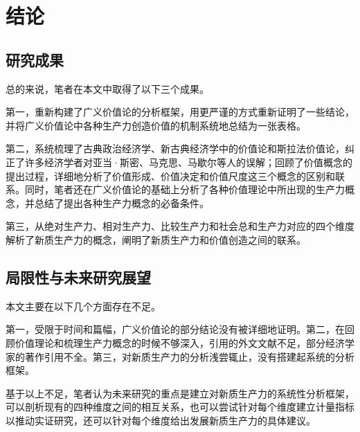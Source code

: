 
\chapter{结论}

\section{研究成果}

总的来说，笔者在本文中取得了以下三个成果。

第一，重新构建了广义价值论的分析框架，用更严谨的方式重新证明了一些结论，并将广义价值论中各种生产力创造价值的机制系统地总结为一张表格。

第二，系统梳理了古典政治经济学、新古典经济学中的价值论和斯拉法价值论，纠正了许多经济学者对亚当·斯密、马克思、马歇尔等人的误解；回顾了价值概念的提出过程，详细地分析了价值形成、价值决定和价值尺度这三个概念的区别和联系。同时，笔者还在广义价值论的基础上分析了各种价值理论中所出现的生产力概念，并总结了提出各种生产力概念的必备条件。

第三，从绝对生产力、相对生产力、比较生产力和社会总和生产力对应的四个维度解析了新质生产力的概念，阐明了新质生产力和价值创造之间的联系。

\section{局限性与未来研究展望}

本文主要在以下几个方面存在不足。

第一，受限于时间和篇幅，广义价值论的部分结论没有被详细地证明。第二，在回顾价值理论和梳理生产力概念的时候不够深入，引用的外文文献不足，部分经济学家的著作引用不全。第三，对新质生产力的分析浅尝辄止，没有搭建起系统的分析框架。

基于以上不足，笔者认为未来研究的重点是建立对新质生产力的系统性分析框架，可以剖析现有的四种维度之间的相互关系，也可以尝试针对每个维度建立计量指标以推动实证研究，还可以针对每个维度给出发展新质生产力的具体建议。
